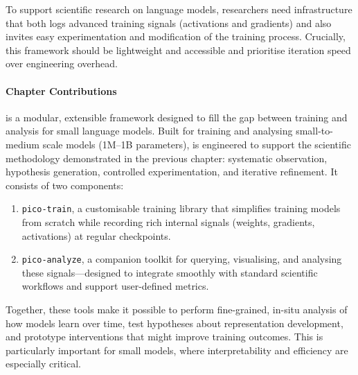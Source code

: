 To support scientific research on language models, researchers need infrastructure that both logs advanced training signals (activations and gradients) and also invites easy experimentation and modification of the training process. Crucially, this framework should be lightweight and accessible and prioritise iteration speed over engineering overhead. 

\paragraph{Chapter Contributions} \pico is a modular, extensible framework designed to fill the gap between training and analysis for small language models. Built for training and analysing small-to-medium scale models (1M--1B parameters), \pico is engineered to support the scientific methodology demonstrated in the previous chapter: systematic observation, hypothesis generation, controlled experimentation, and iterative refinement. It consists of two components:

\begin{enumerate}
    \item \texttt{pico-train}, a customisable training library that simplifies training models from scratch while recording rich internal signals (weights, gradients, activations) at regular checkpoints.
    \item \texttt{pico-analyze}, a companion toolkit for querying, visualising, and analysing these signals—designed to integrate smoothly with standard scientific workflows and support user-defined metrics.
\end{enumerate}

Together, these tools make it possible to perform fine-grained, in-situ analysis of how models learn over time, test hypotheses about representation development, and prototype interventions that might improve training outcomes. This is particularly important for small models, where interpretability and efficiency are especially critical.


